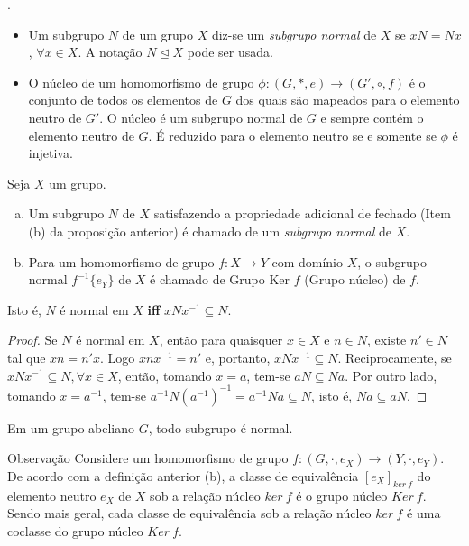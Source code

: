          \newpage
         \begin{definition}.
            \begin{itemize}
               \item Um subgrupo $N$ de um grupo $X$ diz-se um \emph{subgrupo normal} de $X$ se $xN = Nx$, $\forall x \in X$. A notação $N \trianglelefteq X$ pode ser usada.
               \item O núcleo de um homomorfismo de grupo $\phi: (G, * , e) \to (G', \circ , f)$ é o conjunto de todos os elementos de $G$ dos quais são mapeados para o elemento neutro de $G'$. O núcleo é um subgrupo normal de $G$ e sempre contém o elemento neutro de $G$. É reduzido para o elemento neutro se e somente se $\phi$ é injetiva.
            \end{itemize}

            Seja $X$ um grupo.
            \begin{enumerate}[(a)]
               \item Um subgrupo $N$ de $X$ satisfazendo a propriedade adicional de fechado (Item (b) da proposição anterior) é chamado de um \emph{subgrupo normal} de $X$.
               \item Para um homomorfismo de grupo $f: X\to Y$ com domínio $X$, o subgrupo normal $f^{-1}\{e_{Y}\}$ de $X$ é chamado de Grupo Ker $f$ (Grupo núcleo) de $f$.
            \end{enumerate}
            Isto é, $N$ é normal em $X$ \textbf{iff} $xNx^{-1} \subseteq N$. 
            \begin{proof}
               Se $N$ é normal em $X$, então para quaisquer $x \in X$ e $n \in N$, existe $n' \in N$ tal que $xn = n'x$. Logo $xnx^{-1} = n'$ e, portanto, $xNx^{-1} \subseteq N$.
               Reciprocamente, se $xNx^{-1} \subseteq N, \forall x \in X$, então, tomando $x = a$, tem-se $aN \subseteq Na$. Por outro lado, tomando $x = a^{-1}$, tem-se $a^{-1}N(a^{-1})^{-1} = a^{-1}Na \subseteq N$, isto é, $Na \subseteq aN$.
            \end{proof}
         \end{definition}
         \begin{stat}
            Em um grupo abeliano $G$, todo subgrupo é normal.
         \end{stat}
         \begin{mymdframed}{Observação}
            Considere um homomorfismo de grupo $f: (G,\cdot,e_{X}) \to (Y,\cdot,e_{Y})$. De acordo com a definição anterior (b), a classe de equivalência $[e_{X}]_{ker\ f}$ do elemento neutro $e_{X}$ de $X$ sob a relação núcleo $ker\ f$ é o grupo núcleo $Ker\ f$. Sendo mais geral, cada classe de equivalência sob a relação núcleo $ker\ f$ é uma coclasse do grupo núcleo $Ker\ f$.
         \end{mymdframed}

